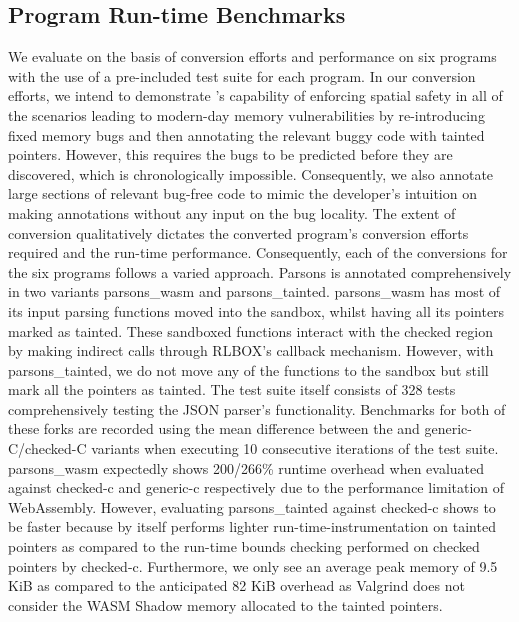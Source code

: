 \subsection{Program Run-time Benchmarks}
We evaluate \systemname on the basis of conversion efforts and performance on six programs with the use of a pre-included test suite for each program. In our conversion efforts, we intend to demonstrate \systemname's capability of enforcing spatial safety in all of the scenarios leading to modern-day memory vulnerabilities by re-introducing fixed memory bugs and then annotating the relevant buggy code with tainted pointers. However, this requires the bugs to be predicted before they are discovered, which is chronologically impossible. Consequently, we also annotate large sections of relevant bug-free code to mimic the developer's intuition on making \systemname annotations without any input on the bug locality. The extent of conversion qualitatively dictates the converted program's conversion efforts required and the run-time performance. Consequently, each of the conversions for the six programs follows a varied approach. Parsons is annotated comprehensively in two variants parsons\_wasm and parsons\_tainted. parsons\_wasm has most of its input parsing functions moved into the sandbox, whilst having all its pointers marked as tainted. These sandboxed functions interact with the checked region by making indirect calls through RLBOX's callback mechanism. However, with parsons\_tainted, we do not move any of the functions to the sandbox but still mark all the pointers as tainted. The test suite itself consists of 328 tests comprehensively testing the JSON parser's functionality. Benchmarks for both of these forks are recorded using the mean difference between the \systemname and generic-C/checked-C variants when executing 10 consecutive iterations of the test suite. parsons\_wasm expectedly shows 200/266\% runtime overhead when evaluated against checked-c and generic-c respectively due to the performance limitation of WebAssembly. However, evaluating parsons\_tainted against checked-c shows \systemname to be faster because \systemname by itself performs lighter run-time-instrumentation on tainted pointers as compared to the run-time bounds checking performed on checked pointers by checked-c. Furthermore, we only see an average peak memory of 9.5 KiB as compared to the anticipated 82 KiB overhead as Valgrind does not consider the WASM Shadow memory allocated to the tainted pointers.

